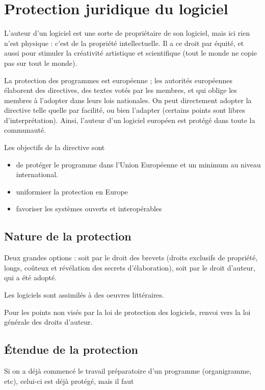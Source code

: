 \chapter{Protection juridique du logiciel}

L'auteur d'un logiciel est une sorte de propriétaire de son logiciel, mais ici rien n'est physique : c'est de la propriété intellectuelle. Il a ce droit par équité, et aussi pour stimuler la créativité artistique et scientifique (tout le monde ne copie pas sur tout le monde).

La protection des programmes est européenne ; les autorités européennes élaborent des directives, des textes votés par les membres, et qui oblige les membres à l'adopter dans leurs lois nationales. On peut directement adopter la directive telle quelle par facilité, ou bien l'adapter (certains points sont libres d'interprétation). Ainsi, l'auteur d'un logiciel européen est protégé dans toute la communauté.

Les objectifs de la directive sont
\begin{itemize} 
	\item de protéger le programme dans l'Union Européenne et un minimum au niveau international.
	\item uniformiser la protection en Europe
	\item favoriser les systèmes ouverts et interopérables
\end{itemize}

	\section{Nature de la protection}
	
	Deux grandes options : soit par le droit des brevets (droits exclusifs de propriété, longs, coûteux et révélation des secrets d'élaboration), soit par le droit d'auteur, qui a été adopté.
	
	Les logiciels sont assimilés à des oeuvres littéraires.
	
	Pour les points non visés par la loi de protection des logiciels, renvoi vers la loi générale des droits d'auteur.
	
	\section{Étendue de la protection}
	
	Si on a déjà commencé le travail préparatoire d'un programme (organigramme, etc), celui-ci est déjà protégé, mais il faut 
	
